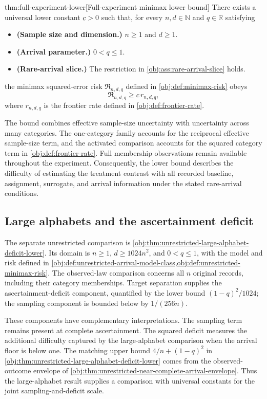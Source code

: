 \begin{theoremv}{thm:full-experiment-lower}[Full-experiment minimax lower bound]
There exists a universal lower constant \(\underline c>0\) such that, for every \(n,d\in\mathbb N\) and \(q\in\mathbb R\) satisfying
\begin{itemize}
\item \textbf{(Sample size and dimension.)} \(n\ge1\) and \(d\ge1\).
\item \textbf{(Arrival parameter.)} \(0<q\le1\).
\item \textbf{(Rare-arrival slice.)} The restriction in \cref{obj:ass:rare-arrival-slice} holds.
\end{itemize}
the minimax squared-error risk \(\mathfrak R_{n,d,q}\) defined in \cref{obj:def:minimax-risk} obeys
\[
\mathfrak R_{n,d,q}\ge \underline c\,r_{n,d,q},
\]
where \(r_{n,d,q}\) is the frontier rate defined in \cref{obj:def:frontier-rate}.
\end{theoremv}

The bound combines effective sample-size uncertainty with uncertainty across many categories. The one-category family accounts for the reciprocal effective sample-size term, and the activated comparison accounts for the squared category term in \cref{obj:def:frontier-rate}. Full membership observations remain available throughout the experiment. Consequently, the lower bound describes the difficulty of estimating the treatment contrast with all recorded baseline, assignment, surrogate, and arrival information under the stated rare-arrival conditions.

\subsection{Large alphabets and the ascertainment deficit}

The separate unrestricted comparison is \cref{obj:thm:unrestricted-large-alphabet-deficit-lower}. Its domain is \(n\ge1\), \(d\ge1024n^2\), and \(0<q\le1\), with the model and risk defined in \cref{obj:def:unrestricted-arrival-model-class,obj:def:unrestricted-minimax-risk}. The observed-law comparison concerns all \(n\) original records, including their category memberships. Target separation supplies the ascertainment-deficit component, quantified by the lower bound \((1-q)^2/1024\); the sampling component is bounded below by \(1/(256n)\).

These components have complementary interpretations. The sampling term remains present at complete ascertainment. The squared deficit measures the additional difficulty captured by the large-alphabet comparison when the arrival floor is below one. The matching upper bound \(4/n+(1-q)^2\) in \cref{obj:thm:unrestricted-large-alphabet-deficit-lower} comes from the observed-outcome envelope of \cref{obj:thm:unrestricted-near-complete-arrival-envelope}. Thus the large-alphabet result supplies a comparison with universal constants for the joint sampling-and-deficit scale.

